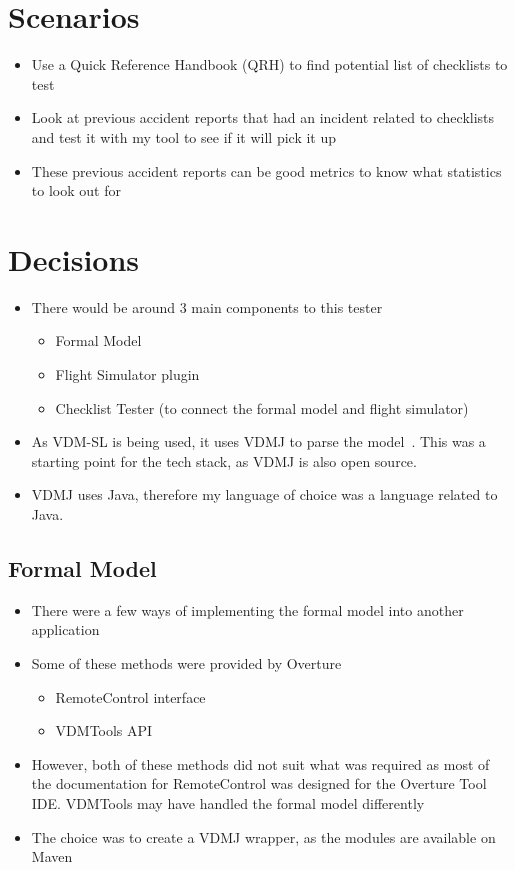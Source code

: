 \documentclass[../dissertation.tex]{subfiles}
\begin{document}
\section{Scenarios}
\begin{itemize}
  \item Use a Quick Reference Handbook (QRH) to find potential list of checklists to test
  \item Look at previous accident reports that had an incident related to checklists
    and test it with my tool to see if it will pick it up
  \item These previous accident reports can be good metrics to know what statistics to
    look out for
\end{itemize}

\section{Decisions}
\begin{itemize}
  \item There would be around 3 main components to this tester
    \begin{itemize}
      \item Formal Model
      \item Flight Simulator plugin
      \item Checklist Tester (to connect the formal model and flight simulator)
    \end{itemize}
  \item As VDM-SL is being used, it uses VDMJ to parse the model~\cite{vdmj}. This was a starting
    point for the tech stack, as VDMJ is also open source.
  \item VDMJ uses Java, therefore my language of choice was a language related to Java.
\end{itemize}

\subsection{Formal Model}
\begin{itemize}
  \item There were a few ways of implementing the formal model into another application
  \item Some of these methods were provided by Overture~\cite{overture-remote}
    \begin{itemize}
      \item RemoteControl interface
      \item VDMTools API~\cite{vdmtoolbox-api}
    \end{itemize}
  \item However, both of these methods did not suit what was required as most of the
    documentation for RemoteControl was designed for the Overture Tool IDE. VDMTools
    may have handled the formal model differently
  \item The choice was to create a VDMJ wrapper, as the modules are available on Maven
\end{itemize}
\end{document}
